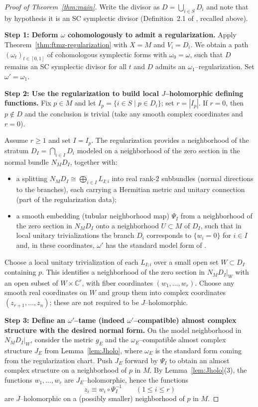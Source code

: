 \documentclass[11pt]{article}
\theoremstyle{definition}
\begin{document}
\begin{proof}[Proof of Theorem~\ref{thm:main}]
Write the divisor as $D=\bigcup_{i\in S}D_i$ and note that by hypothesis it is an SC symplectic divisor
(Definition~2.1 of \cite{FTMZ}, recalled above).

\smallskip\noindent
\textbf{Step 1: Deform $\omega$ cohomologously to admit a regularization.}
Apply Theorem~\ref{thm:ftmz-regularization} with $X=M$ and $V_i=D_i$.
We obtain a path $(\omega_t)_{t\in[0,1]}$ of cohomologous symplectic forms with $\omega_0=\omega$, such that $D$ remains an SC symplectic
divisor for all $t$ and $D$ admits an $\omega_1$--regularization.
Set $\omega'=\omega_1$.

\smallskip\noindent
\textbf{Step 2: Use the regularization to build local $J$--holomorphic defining functions.}
Fix $p\in M$ and let $I_p=\{i\in S\mid p\in D_i\}$; set $r=|I_p|$.
If $r=0$, then $p\notin D$ and the conclusion is trivial (take any smooth complex coordinates and $r=0$).

Assume $r\ge 1$ and set $I=I_p$. The regularization provides a neighborhood of the stratum
$D_I=\bigcap_{i\in I}D_i$ modeled on a neighborhood of the zero section in the normal bundle $N_MD_I$, together with:
\begin{itemize}
\item a splitting $N_MD_I\cong\bigoplus_{i\in I} L_{I;i}$ into real rank-$2$ subbundles (normal directions to the branches),
each carrying a Hermitian metric and unitary connection (part of the regularization data);
\item a smooth embedding (tubular neighborhood map) $\Psi_I$ from a neighborhood of the zero section in $N_MD_I$ onto a neighborhood
$U\subset M$ of $D_I$, such that in local unitary trivializations the branch $D_i$ corresponds to $\{w_i=0\}$ for $i\in I$
and, in these coordinates, $\omega'$ has the standard model form of \cite[(2.9)--(2.11)]{FTMZ}.
\end{itemize}
Choose a local unitary trivialization of each $L_{I;i}$ over a small open set $W\subset D_I$ containing $p$.
This identifies a neighborhood of the zero section in $N_MD_I|_W$ with an open subset of $W\times\mathbb C^r$,
with fiber coordinates $(w_1,\dots,w_r)$.
Choose any smooth real coordinates on $W$ and group them into complex coordinates $(z_{r+1},\dots,z_n)$; these are not required to be
$J$--holomorphic.

\smallskip\noindent
\textbf{Step 3: Define an $\omega'$--tame (indeed $\omega'$--compatible) almost complex structure with the desired normal form.}
On the model neighborhood in $N_MD_I|_W$, consider the metric $g_E$ and the $\omega_E$--compatible almost complex structure $J_E$ from
Lemma~\ref{lem:Jholo}, where $\omega_E$ is the standard form coming from the regularization chart.
Push $J_E$ forward by $\Psi_I$ to obtain an almost complex structure on a neighborhood of $p$ in $M$.
By Lemma~\ref{lem:Jholo}(3), the functions $w_1,\dots,w_r$ are $J_E$--holomorphic, hence the functions
\[
z_i \equiv w_i\circ \Psi_I^{-1}\qquad (1\le i\le r)
\]
are $J$--holomorphic on a (possibly smaller) neighborhood of $p$ in $M$.


\end{proof}
\end{document}
